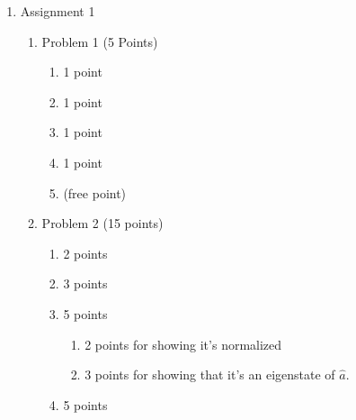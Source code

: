 \documentclass{article}
\begin{document}
\begin{enumerate}
   \item Assignment 1
      \begin{enumerate}
         \item Problem 1 (5 Points)
            \begin{enumerate}
               \item 1 point
               \item 1 point
               \item 1 point
               \item 1 point
               \item (free point)
            \end{enumerate}
         \item Problem 2 (15 points)
            \begin{enumerate}
               \item 2 points
               \item 3 points
               \item 5 points
                  \begin{enumerate}
                  \item 2 points for showing it's normalized
                  \item 3 points for showing that it's an eigenstate of $
                     \hat{a} $.
                  \end{enumerate}
               \item 5 points
            \end{enumerate}
      \end{enumerate}
\end{enumerate}
\end{document}
